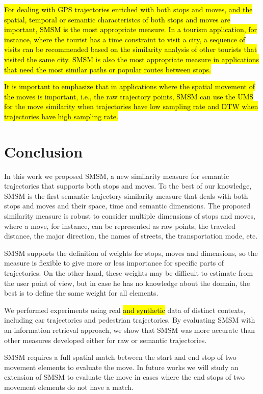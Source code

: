 \documentclass[12pt]{article}
\begin{document}
\hl{For dealing with GPS trajectories enriched with both stops and moves, and the spatial, temporal or semantic characteristcs of both stops and moves are important, SMSM is the most appropriate measure. In a tourism application, for instance, where the tourist has a time constraint to visit a city, a sequence of visits can be recommended based on the similarity analysis of other tourists that visited the same city. SMSM is also the most appropriate measure in applications that need the most similar paths or popular routes between stops.}

\hl{It is important to emphasize that in applications where the spatial movement of the moves is important, i.e., the raw trajectory points, SMSM can use the UMS for the move similarity when trajectories have low sampling rate and DTW when trajectories have high sampling rate.}


\section{Conclusion} \label{sec:conclusions}
In this work we proposed SMSM, a new similarity measure for semantic trajectories that supports both stops and moves.  To the best of our knowledge, SMSM is the first semantic trajectory similarity measure that deals with both stops and moves and their space, time and semantic dimensions. The proposed similarity measure is robust  to consider multiple dimensions of stops and moves, where a move, for instance, can be represented as raw points, the traveled distance, the major direction, the names of streets, the transportation mode, etc.

SMSM supports the definition of weights for stops, moves and dimensions, so the measure is flexible to give more or less importance for specific parts of trajectories. On the other hand, these weights may be difficult to estimate from the user point of view, but in case he has no knowledge about the domain, the best is to define the same weight for all elements.

We performed experiments using real \hl{and synthetic} data of distinct contexts, including car trajectories and pedestrian trajectories. By evaluating SMSM with an information retrieval approach, we show that SMSM was more accurate than other measures developed either for raw or semantic trajectories.

SMSM requires a full spatial match between the start and end stop of two movement elements to evaluate the move. In future works we will study an extension of SMSM to evaluate the move in cases where the end stops of two movement elements do not have a match.



\end{document}
